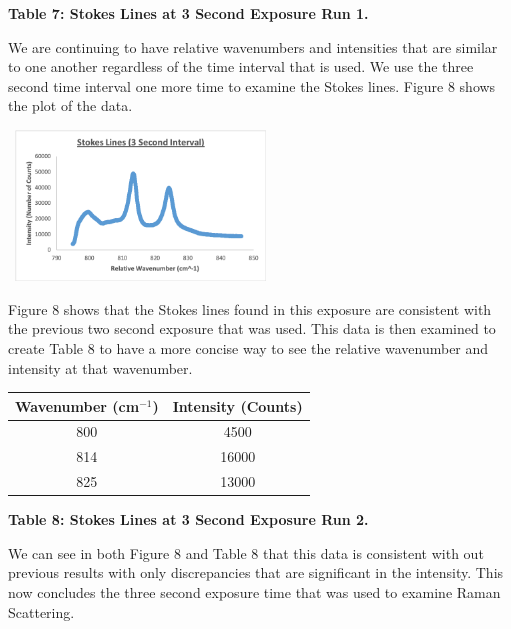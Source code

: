 \documentclass[]{article}
\begin{document}
\begin{multicols}{2}
\centerline{\tiny\textbf{{Table 7: Stokes Lines at 3 Second Exposure Run 1.}}}
\newline
We are continuing to have relative wavenumbers and intensities that are similar to one another regardless of the time interval that is used. We use the three second time interval one more time to examine the Stokes lines. Figure 8 shows the plot of the data.
\begin{center}
    \includegraphics[width=7cm, height=4cm]{PHYS 331 RS (3 Sec) 2b.png}
    \caption{\textbf{\small{Figure 8:} Stokes Lines at 3 Second Exposure Run 2.}}
\end{center}
Figure 8 shows that the Stokes lines found in this exposure are consistent with the previous two second exposure that was used. This data is then examined to create Table 8 to have a more concise way to see the relative wavenumber and intensity at that wavenumber.
\newline
\begin{tabular}{|c|c|}
    \hline \textbf{Wavenumber (cm$^{-1}$)} & \textbf{Intensity (Counts)} \\ \hline
    800 & 4500 \\ \hline
    814 & 16000 \\ \hline
    825 & 13000 \\ \hline
\end{tabular}
\centerline{\tiny\textbf{{Table 8: Stokes Lines at 3 Second Exposure Run 2.}}}
\newline
We can see in both Figure 8 and Table 8 that this data is consistent with out previous results with only  discrepancies that are significant in the intensity. This now concludes the three second exposure time that was used to examine Raman Scattering.

\end{multicols}
\end{document}
